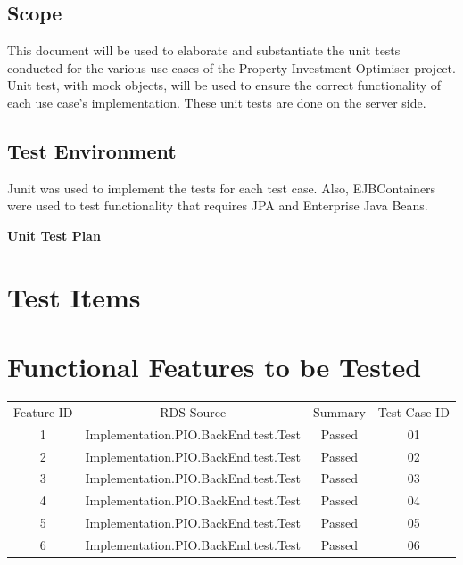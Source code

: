 \documentclass[a4paper,12pt]{article}
\begin{document}
\subsection{Scope}
This document will be used to elaborate and substantiate the unit tests conducted for the various use
cases of the Property Investment Optimiser project. Unit test, with mock objects, will be used to ensure the correct functionality of each use case's implementation. These unit tests are done on the server side.

\subsection{Test Environment}
Junit was used to implement the tests for each test case. Also, EJBContainers were used to test functionality that requires JPA and Enterprise Java Beans.


\newpage
\begin{center}
{\huge \bfseries Unit Test Plan}\\[0.5cm]
\end{center}
\section{Test Items}

\section{Functional Features to be Tested}
\begin{center}
 \begin{tabular}{||c| c| c| c||} 
 \hline
 Feature ID & RDS Source & Summary & Test Case ID \\ [0.5ex]
 1 & Implementation.PIO.BackEnd.test.Test & Passed & 01 \\
 2 & Implementation.PIO.BackEnd.test.Test & Passed & 02 \\
 3 & Implementation.PIO.BackEnd.test.Test & Passed & 03 \\
 4 & Implementation.PIO.BackEnd.test.Test & Passed & 04 \\
 5 & Implementation.PIO.BackEnd.test.Test & Passed & 05 \\
 6 & Implementation.PIO.BackEnd.test.Test & Passed & 06 \\

 \hline\hline
\end{tabular}
\end{center}
\end{document}
